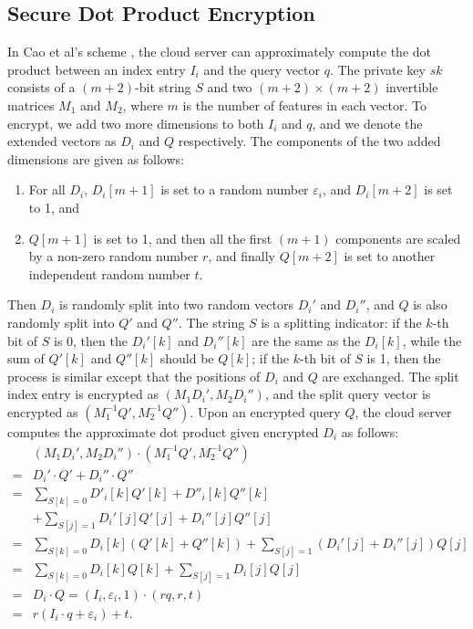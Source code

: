 \documentclass{IEEEtran}
\begin{document}
\subsection{Secure Dot Product Encryption}
In Cao et al's scheme \cite{Cao14}, the cloud server can approximately compute the dot product between an index entry $I_i$ and the query vector $q$. The private key $sk$ consists of a $(m+2)$-bit string $S$ and two $(m+2)\times (m+2)$ invertible matrices $M_1$ and $M_2$, where $m$ is the number of features in each vector. To encrypt, we add two more dimensions to both $I_i$ and $q$, and we denote the extended vectors as $D_i$ and $Q$ respectively. The components of the two added dimensions are given as follows: 
\begin{enumerate}
\item For all $D_i$, $D_i[m+1]$ is set to a random number $\varepsilon_i$, and $D_i[m+2]$ is set to 1, and
\item $Q[m+1]$ is set to 1, and then all the first $(m+1)$ components are scaled by a non-zero random number $r$, and finally $Q[m+2]$ is set to another independent random number $t$. 
\end{enumerate}
Then $D_i$ is randomly split into two random vectors $D_i'$ and $D_i''$, and $Q$ is also randomly split into $Q'$ and $Q''$. The string $S$ is a splitting indicator: if the $k$-th bit of $S$ is 0, then the $D_i'[k]$ and $D_i''[k]$ are the same as the $D_i[k]$, while the sum of $Q'[k]$ and $Q''[k]$ should be $Q[k]$; if the $k$-th bit of $S$ is 1, then the process is similar except that the positions of $D_i$ and $Q$ are exchanged. The split index entry is encrypted as $(M_1D_i', M_2D_i'')$, and the split query vector is encrypted as $(M_1^{-1}Q', M_2^{-1}Q'')$. Upon an encrypted query $Q$, the cloud server computes the approximate dot product given encrypted $D_i$ as follows:
\begin{equation*}
\begin{aligned}
&(M_1D_i', M_2D_i'')\cdot(M_1^{-1}Q', M_2^{-1}Q'') \\
=&D_i'\cdot Q' + D_i''\cdot Q''\\
=&\sum_{S[k]=0}D'_i[k] Q'[k] + D''_i[k] Q''[k] \\
&+ \sum_{S[j]=1} D_i'[j] Q'[j] + D_i''[j] Q''[j]\\
=&\sum_{S[k]=0}D_i[k](Q'[k] + Q''[k]) + \sum_{S[j]=1} (D_i'[j]+ D_i''[j])Q[j]\\
=&\sum_{S[k]=0}D_i[k]Q[k] + \sum_{S[j]=1} D_i[j]Q[j]\\
=&D_i \cdot Q = (I_i,\varepsilon_i,1)\cdot (rq,r,t)\\
=&r(I_i\cdot q+\varepsilon_i)+t.
\end{aligned}
\end{equation*}
\end{document}
